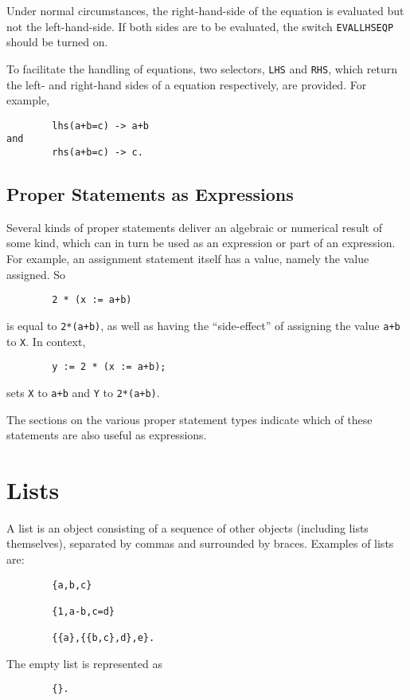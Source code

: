 Under normal circumstances, the right-hand-side of the equation is evaluated
but not the left-hand-side.  If both sides are to be evaluated, the switch
{\tt EVALLHSEQP} should be turned on.

To facilitate the handling of equations, two selectors, {\tt LHS}
 and {\tt RHS}, which return the left- and
right-hand sides of a equation respectively, are provided.
For example,
\begin{verbatim}
        lhs(a+b=c) -> a+b
and
        rhs(a+b=c) -> c.
\end{verbatim}

\section{Proper Statements as Expressions}

Several kinds of proper statements deliver
an algebraic or numerical result of some kind, which can in turn be used as
an expression or part of an expression.  For example, an assignment
statement itself has a value, namely the value assigned.  So
\begin{verbatim}
        2 * (x := a+b)
\end{verbatim}
is equal to {\tt 2*(a+b)}, as well as having the ``side-effect'' of assigning the value {\tt a+b} to {\tt X}.  In context,
\begin{verbatim}
        y := 2 * (x := a+b);
\end{verbatim}
sets {\tt X} to {\tt a+b} and {\tt Y} to {\tt 2*(a+b)}.

The sections on the various proper statement types
indicate which of these statements are also useful as expressions.

\chapter{Lists}

A list is an object consisting of a sequence of other objects
(including lists themselves), separated by commas and surrounded by
braces.  Examples of lists are:
\begin{verbatim}
        {a,b,c}

        {1,a-b,c=d}

        {{a},{{b,c},d},e}.
\end{verbatim}
The empty list is represented as
\begin{verbatim}
        {}.
\end{verbatim}

